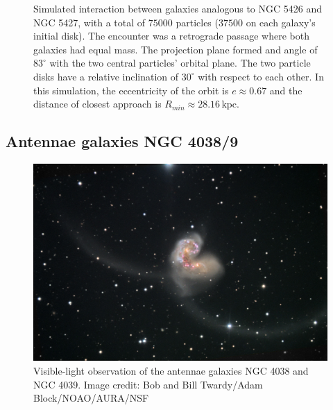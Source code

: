 \documentclass[11pt,twocolumn]{article}
\newcommand{\unit}[1]{\ensuremath{\, \mathrm{#1}}}
\begin{document}
\begin{figure}[!tbp]
            \caption{Simulated interaction between galaxies analogous to NGC 5426 and NGC 5427, with a total of $75000$ particles ($37500$ on each galaxy's initial disk). The encounter was a retrograde passage where both galaxies had equal mass. The projection plane formed and angle of $83^{\circ}$ with the two central particles' orbital plane. The two particle disks have a relative inclination of $30^{\circ}$ with respect to each other. In this simulation, the eccentricity of the orbit is $e \approx 0.67$ and the distance of closest approach is $R_{min} \approx 28.16 \unit{kpc}$.}
            \label{fig:ngc5426}
            
            \label{fig:ngc5426}
		\end{figure}

        
        
        \subsection{Antennae galaxies NGC 4038/9}
    \begin{figure}[htbp]
\begin{center}
\includegraphics[width=\linewidth]{Antennae/noao-kittpeak-antennae.jpg}
\caption{Visible-light observation of the antennae galaxies NGC 4038 and NGC 4039. Image credit: Bob and Bill Twardy/Adam Block/NOAO/AURA/NSF}
\label{AntennaeKP}
\end{center}
\end{figure}
\end{document}
